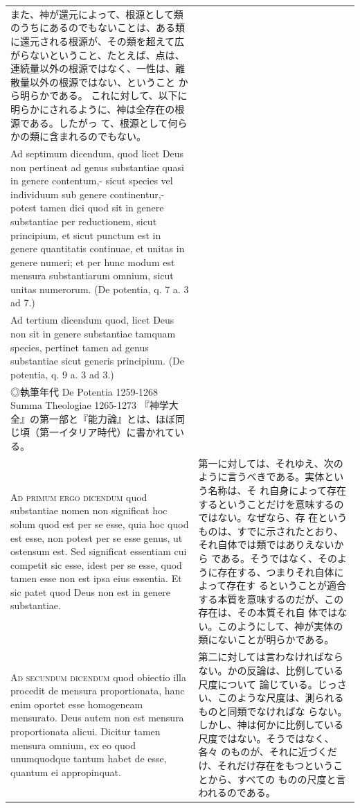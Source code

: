 \documentclass[paper=a4paper,fontsize=10pt,jafontsize=9pt,titlepage]{jlreq}
\begin{document}
\begin{longtable}{p{21em}p{21em}}
また、神が還元によって、根源として類のうちにあるのでもないことは、ある類
 に還元される根源が、その類を超えて広がらないということ、たとえば、点は、
 連続量以外の根源ではなく、一性は、離散量以外の根源ではない、ということ
 から明らかである。
これに対して、以下に明らかにされるように、神は全存在の根源である。したがっ
 て、根源として何らかの類に含まれるのでもない。\footnote{◎しかし、ここ
 に見られる「神は還元によっても実体でない」という主張は、安定していない。
\\
Ad septimum dicendum, quod licet Deus non pertineat ad genus substantiae
 quasi in genere contentum,- sicut species vel individuum sub genere
 continentur,- potest tamen dici quod sit in genere substantiae per
 reductionem, sicut principium, et sicut punctum est in genere
 quantitatis continuae, et unitas in genere numeri; et per hunc modum
 est mensura substantiarum omnium, sicut unitas numerorum. (De potentia,
 q. 7 a. 3 ad 7.)
\\
Ad tertium dicendum quod, licet Deus non sit in genere substantiae
 tamquam species, pertinet tamen ad genus substantiae sicut generis
 principium. (De potentia, q. 9 a. 3 ad 3.)
\\
◎執筆年代
De Potentia 1259-1268
Summa Theologiae 1265-1273
『神学大全』の第一部と『能力論』とは、ほぼ同じ頃（第一イタリア時代）に書かれている。
}


\\

{\scshape Ad primum ergo dicendum} quod substantiae nomen non significat
 hoc solum quod est per se esse, quia hoc quod est esse, non potest per
 se esse genus, ut ostensum est. Sed significat essentiam cui competit
 sic esse, idest per se esse, quod tamen esse non est ipsa eius
 essentia. Et sic patet quod Deus non est in genere substantiae.

&

第一に対しては、それゆえ、次のように言うべきである。実体という名称は、そ
 れ自身によって存在するということだけを意味するのではない。なぜなら、存
 在というものは、すでに示されたとおり、それ自体では類ではありえないから
 である。そうではなく、そのように存在する、つまりそれ自体によって存在す
 るということが適合する本質を意味するのだが、この存在は、その本質それ自
 体ではない。このようにして、神が実体の類にないことが明らかである。

\\

{\scshape Ad secundum dicendum} quod obiectio illa procedit de mensura
 proportionata, hanc enim oportet esse homogeneam mensurato. Deus autem
 non est mensura proportionata alicui. Dicitur tamen mensura omnium, ex
 eo quod unumquodque tantum habet de esse, quantum ei appropinquat.

&

第二に対しては言わなければならない。かの反論は、比例している尺度について
 論じている。じっさい、このような尺度は、測られるものと同類でなければな
 らない。しかし、神は何かに比例している尺度ではない。そうではなく、各々
 のものが、それに近づくだけ、それだけ存在をもつということから、すべての
 ものの尺度と言われるのである。


\end{longtable}
\end{document}
